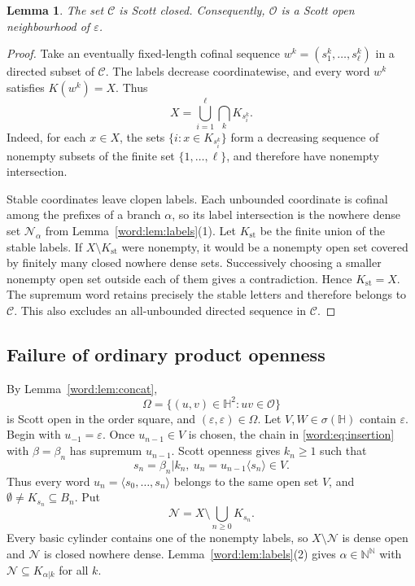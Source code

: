 \documentclass[10pt,a4paper]{article}
\newtheorem{lemma}[theorem]{Lemma}
\theoremstyle{definition}
\newcommand{\N}{\mathbb N}
\newcommand{\HH}{\mathbb H}
\begin{document}
\begin{lemma}\label{word:lem:closed}
The set $\mathcal C$ is Scott closed. Consequently, $\mathcal O$ is a Scott open neighbourhood of $\varepsilon$.
\end{lemma}
\begin{proof}
Take an eventually fixed-length cofinal sequence
$w^k=(s_1^k,\ldots,s_\ell^k)$ in a directed subset of $\mathcal C$. The labels decrease coordinatewise, and every word $w^k$ satisfies $K(w^k)=X$. Thus
\begin{equation}\label{word:eq:finiteinter}
 X=\bigcup_{i=1}^{\ell}\bigcap_kK_{s_i^k}.
\end{equation}
Indeed, for each $x\in X$, the sets $\{i:x\in K_{s_i^k}\}$ form a decreasing sequence of nonempty subsets of the finite set $\{1,\ldots,\ell\}$, and therefore have nonempty intersection.

Stable coordinates leave clopen labels. Each unbounded coordinate is cofinal among the prefixes of a branch $\alpha$, so its label intersection is the nowhere dense set $\mathcal N_\alpha$ from Lemma~\ref{word:lem:labels}(1). Let $K_{\mathrm{st}}$ be the finite union of the stable labels. If $X\setminus K_{\mathrm{st}}$ were nonempty, it would be a nonempty open set covered by finitely many closed nowhere dense sets. Successively choosing a smaller nonempty open set outside each of them gives a contradiction. Hence $K_{\mathrm{st}}=X$. The supremum word retains precisely the stable letters and therefore belongs to $\mathcal C$. This also excludes an all-unbounded directed sequence in $\mathcal C$.
\end{proof}

\subsection{Failure of ordinary product openness}
By Lemma~\ref{word:lem:concat},
\[
 \Omega=\{(u,v)\in\HH^2:uv\in\mathcal O\}
\]
is Scott open in the order square, and $(\varepsilon,\varepsilon)\in\Omega$. Let $V,W\in\sigma(\HH)$ contain $\varepsilon$. Begin with $u_{-1}=\varepsilon$. Once $u_{n-1}\in V$ is chosen, the chain in \eqref{word:eq:insertion} with $\beta=\beta_n$ has supremum $u_{n-1}$. Scott openness gives $k_n\geq1$ such that
\begin{equation}\label{word:eq:left}
 s_n=\beta_n|k_n,
 ~
 u_n=u_{n-1}\langle s_n\rangle\in V.
\end{equation}
Thus every word $u_n=\langle s_0,\ldots,s_n\rangle$ belongs to the same open set $V$, and
$\emptyset\neq K_{s_n}\subseteq B_n$. Put
\[
 \mathcal N=X\setminus\bigcup_{n\geq0}K_{s_n}.
\]
Every basic cylinder contains one of the nonempty labels, so $X\setminus\mathcal N$ is dense open and $\mathcal N$ is closed nowhere dense. Lemma~\ref{word:lem:labels}(2) gives $\alpha\in\N^\N$ with
$\mathcal N\subseteq K_{\alpha|k}$ for all $k$.
\end{document}
